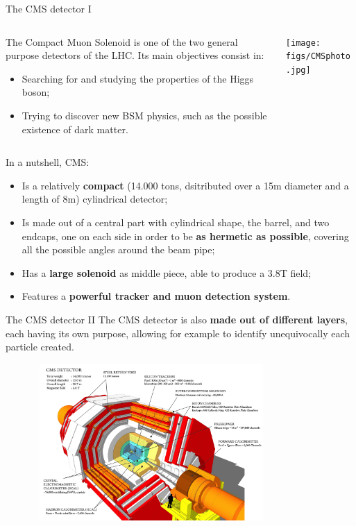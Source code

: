 \documentclass[8pt]{beamer}
\begin{document}
\begin{frame}{The CMS detector I}
\justifying

\begin{columns}
\begin{column}{0.56	\textwidth}
\justifying
The \alert{Compact Muon Solenoid} is one of the two general purpose detectors of the LHC. Its main objectives consist in:
\begin{itemize}
\justifying
\item Searching for and studying the properties of the Higgs boson;
\item Trying to discover new BSM physics, such as the possible existence of dark matter.
\end{itemize}
\end{column}
\begin{column}{0.40	\textwidth}
\begin{center}
\texttt{[image: figs/CMSphoto.jpg]}
\end{center}
\end{column}
\end{columns} \vfill

In a nutshell, CMS:
\begin{itemize}
\justifying
\item Is a relatively \textbf{compact} (14.000 tons, dsitributed over a 15m diameter and a length of 8m) cylindrical detector; 
\item Is made out of a central part with cylindrical shape, the barrel, and two endcaps, one on each side in order to be \textbf{as hermetic as possible}, covering all the possible angles around the beam pipe;
\item Has a \textbf{large solenoid} as middle piece, able to produce a 3.8T field;
\item Features a \textbf{powerful tracker and muon detection system}.
\end{itemize} \vfill
\end{frame}

\begin{frame}{The CMS detector II}
\justifying
The CMS detector is also \textbf{made out of different layers}, each having its own purpose, allowing for example to identify unequivocally each particle created. \vfill

\begin{figure}[htbp]
\begin{center}
\includegraphics[width=9cm, height=6cm]{figs/CMS.png}
\end{center}
\end{figure} \vfill
\end{frame}
\end{document}
